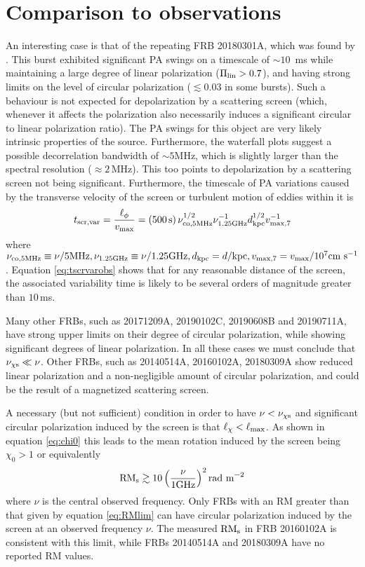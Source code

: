 \documentclass[fleqn,usenatbib]{mnras}
\begin{document}
	
	\section{Comparison to observations}
	\label{obs}
	
	An interesting case is that of the repeating FRB 20180301A, which was found by \cite{LuoPol}. This burst exhibited significant PA swings on a timescale of $\sim 10$\, ms while maintaining a large degree of linear polarization ($\Pi_{\rm lin}>0.7$), and having strong limits on the level of circular polarization ($\lesssim 0.03$ in some bursts). Such a behaviour is not expected for depolarization by a scattering screen (which, whenever it affects the polarization also necessarily induces a significant circular to linear polarization ratio). The PA swings for this object are very likely intrinsic properties of the source. Furthermore, the waterfall plots suggest a possible decorrelation bandwidth of $\sim 5$MHz, which is slightly larger than the spectral resolution ($\approx 2$\,MHz). This too points to depolarization by a scattering screen not being significant. Furthermore, the timescale of PA variations caused by the transverse velocity of the screen or turbulent motion of eddies within it is
	\begin{equation}
		\label{eq:tscrvarobs}
		t_{\rm scr,var}=\frac{\ell_{\phi}}{v_{\rm max}}= ({\rm 500\, s})\, \nu_{\rm co,5MHz}^{1/2}\nu_{\rm 1.25GHz}^{-1} d_{\rm kpc}^{1/2} v_{\rm max,7}^{-1}
	\end{equation}
	where $\nu_{\rm co,5MHz}\equiv \nu/\mbox{5MHz},\nu_{\rm 1.25GHz}\equiv\nu/1.25\mbox{GHz},d_{\rm kpc}=d/\mbox{kpc},v_{\rm max,7}=v_{\rm max}/10^7\mbox{cm s}^{-1}$. Equation \ref{eq:tscrvarobs} shows that for any reasonable distance of the screen, the associated variability time is likely to be several orders of magnitude greater than $10$\,ms.
	
	Many other FRBs, such as 20171209A, 20190102C, 20190608B and 20190711A, have strong upper limits on their degree of circular polarization, while showing significant degrees of linear polarization. In all these cases we must conclude that $\nu_{\chi \rm s}\ll \nu$. Other FRBs, such as 20140514A, 20160102A, 20180309A show reduced linear polarization and a non-negligible amount of circular polarization, and could be the result of a magnetized scattering screen.
	
	A necessary (but not sufficient) condition in order to have $\nu<\nu_{\chi \rm s}$ and significant circular polarization induced by the screen is that $\ell_{\chi}<\ell_{\rm max}$. As shown in equation \ref{eq:chi0} this leads to the mean rotation induced by the screen being $\chi_0>1$ or equivalently
	\begin{equation}
		\label{eq:RMlim}
		\mbox{RM}_{\rm s}\gtrsim 10 \left(\frac{\nu}{1\mbox{GHz}}\right)^2\mbox{rad m}^{-2}
	\end{equation}
	where $\nu$ is the central observed frequency. Only FRBs with an RM greater than that given by equation \ref{eq:RMlim} can have circular polarization induced by the screen at an observed frequency $\nu$. The measured $\mbox{RM}_{\rm s}$ in FRB 20160102A is consistent with this limit, while FRBs 20140514A and 20180309A have no reported $\mbox{RM}$ values.
	
\end{document}
